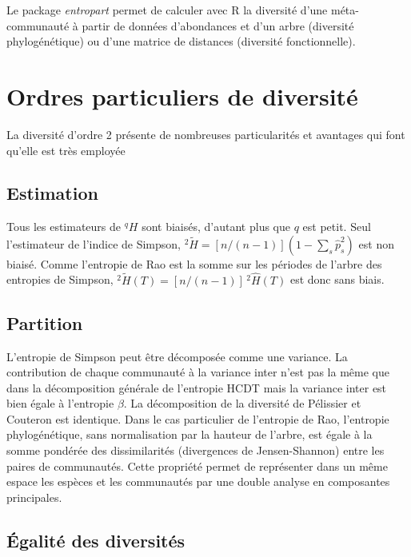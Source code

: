\documentclass[
  11pt,
  french,
  a4paper,
  extrafontsizes,onecolumn,openright
  ]{memoir}
\begin{document}
Le package \emph{entropart}\autocite{Marcon2014c} permet de calculer avec R la diversité d'une méta-communauté à partir de données d'abondances et d'un arbre (diversité phylogénétique) ou d'une matrice de distances (diversité fonctionnelle).

\hypertarget{ordres-particuliers-de-diversituxe9}{%
\section{Ordres particuliers de diversité}\label{ordres-particuliers-de-diversituxe9}}

La diversité d'ordre 2 présente de nombreuses particularités et avantages qui font qu'elle est très employée

\hypertarget{estimation-2}{%
\subsection{Estimation}\label{estimation-2}}

Tous les estimateurs de \(^q\!H\) sont biaisés, d'autant plus que \(q\) est petit.
Seul l'estimateur de l'indice de Simpson, \(^{2}\!\tilde{H}=[n/(n-1)](1-\sum_s{{\hat{p}}^{2}_{s}})\) est non biaisé.
Comme l'entropie de Rao est la somme sur les périodes de l'arbre des entropies de Simpson, \(^{2}\!\tilde{H}(T)=[n/(n-1)]\,^{2}\!\hat{H}(T)\) est donc sans biais.

\hypertarget{partition}{%
\subsection{Partition}\label{partition}}

L'entropie de Simpson peut être décomposée comme une variance.
La contribution de chaque communauté à la variance inter n'est pas la même que dans la décomposition générale de l'entropie HCDT mais la variance inter est bien égale à l'entropie \(\beta\).
La décomposition de la diversité de Pélissier et Couteron est identique.
Dans le cas particulier de l'entropie de Rao, l'entropie phylogénétique, sans normalisation par la hauteur de l'arbre, est égale à la somme pondérée des dissimilarités (divergences de Jensen-Shannon) entre les paires de communautés.
Cette propriété permet de représenter dans un même espace les espèces et les communautés par une double analyse en composantes principales.

\hypertarget{uxe9galituxe9-des-diversituxe9s}{%
\subsection{Égalité des diversités}\label{uxe9galituxe9-des-diversituxe9s}}
\end{document}
